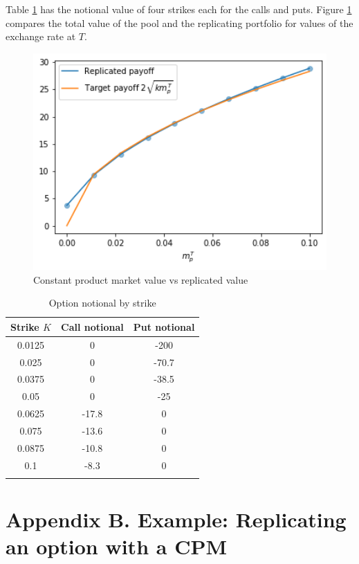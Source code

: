 \documentclass[12pt]{article}
\begin{document}
Table \ref{tab:OptStrikeWt} has the notional value of four strikes each for the calls and puts. Figure \ref{fig:CPMReplication} compares the total value of the pool and the replicating portfolio for values of the exchange rate at $T$.


\begin{figure}[t] 
\includegraphics[width=12cm]{figs/replicatedCPM.png}
\centering
\caption{Constant product market value vs replicated value}
\label{fig:CPMReplication}
\end{figure}


   \begin{table}[!ht]
     \caption{Option notional by strike  }\label{tab:OptStrikeWt}
     \centering
     \begin{tabular}{ccc}\toprule
       Strike $K$ & Call notional & Put notional \\ \midrule
       
       0.0125 & 0 & -200     \\
       0.025 & 0 &-70.7    \\
       0.0375 & 0 & -38.5   \\ 
       0.05 & 0 & -25    \\
       0.0625 & -17.8 & 0   \\
       0.075 & -13.6 & 0  \\
       0.0875 & -10.8 & 0 \\
       0.1 & -8.3 & 0 \\
       \toprule
       \addlinespace
     \end{tabular}

   \end{table}
   
\section*{Appendix B. Example: Replicating an option with a CPM} \label{sec:appendixb}
\end{document}
